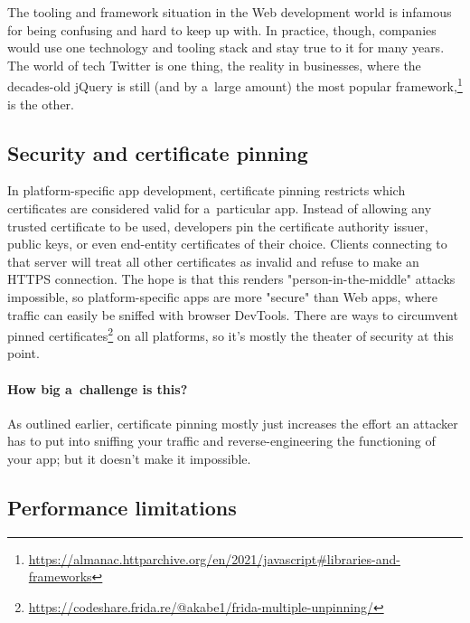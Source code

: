 \documentclass[sigconf]{acmart}
\begin{document}
The tooling and framework situation in the Web development world is infamous for being confusing and hard to keep up with. In practice, though, companies would use one technology and tooling stack and stay true to it for many years. The world of tech Twitter is one thing, the reality in businesses, where the decades-old jQuery is still (and by a~large amount) the most popular framework,\footnote{\url{https://almanac.httparchive.org/en/2021/javascript\#libraries-and-frameworks}} is the other.

\subsection{Security and certificate pinning}

In platform-specific app development, certificate pinning restricts which certificates are considered valid for a~particular app. Instead of allowing any trusted certificate to be used, developers pin the certificate authority issuer, public keys, or even end-entity certificates of their choice. Clients connecting to that server will treat all other certificates as invalid and refuse to make an HTTPS connection. The hope is that this renders "person-in-the-middle" attacks impossible, so platform-specific apps are more "secure" than Web apps, where traffic can easily be sniffed with browser DevTools. There are ways to circumvent pinned certificates\footnote{\url{https://codeshare.frida.re/@akabe1/frida-multiple-unpinning/}} on all platforms, so it's mostly the theater of security at this point.

\paragraph{How big a~challenge is this?}

As outlined earlier, certificate pinning mostly just increases the effort an attacker has to put into sniffing your traffic and reverse-engineering the functioning of your app; but it doesn't make it impossible.

\subsection{Performance limitations}
\end{document}
